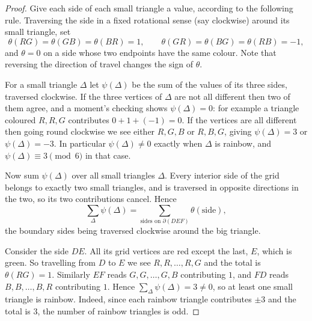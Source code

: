 \documentclass[a4paper]{scrartcl}
\begin{document}
\begin{proof}
	Give each side of each small triangle a value, according to the following rule. Traversing the side in a fixed rotational sense (say clockwise) around its small triangle, set
	$$\theta(RG) = \theta(GB) = \theta(BR) = 1, \qquad \theta(GR)=\theta(BG)=\theta(RB) = -1,$$
	and $\theta = 0$ on a side whose two endpoints have the same colour. Note that reversing the direction of travel changes the sign of $\theta$.

	For a small triangle $\Delta$ let $\psi(\Delta)$ be the sum of the values of its three sides, traversed clockwise. If the three vertices of $\Delta$ are not all different then two of them agree, and a moment's checking shows $\psi(\Delta) = 0$: for example a triangle coloured $R,R,G$ contributes $0 + 1 + (-1) = 0$. If the vertices are all different then going round clockwise we see either $R,G,B$ or $R,B,G$, giving $\psi(\Delta) = 3$ or $\psi(\Delta) = -3$. In particular $\psi(\Delta) \neq 0$ exactly when $\Delta$ is rainbow, and $\psi(\Delta) \equiv 3 \pmod 6$ in that case.

	Now sum $\psi(\Delta)$ over all small triangles $\Delta$. Every interior side of the grid belongs to exactly two small triangles, and is traversed in opposite directions in the two, so its two contributions cancel. Hence
	$$\sum_\Delta \psi(\Delta) = \sum_{\text{sides on }\partial(DEF)} \theta(\text{side}),$$
	the boundary sides being traversed clockwise around the big triangle.

	Consider the side $DE$. All its grid vertices are red except the last, $E$, which is green. So travelling from $D$ to $E$ we see $R,R,\ldots,R,G$ and the total is $\theta(RG) = 1$. Similarly $EF$ reads $G,G,\ldots,G,B$ contributing $1$, and $FD$ reads $B,B,\ldots,B,R$ contributing $1$. Hence $\sum_\Delta \psi(\Delta) = 3 \neq 0$, so at least one small triangle is rainbow. Indeed, since each rainbow triangle contributes $\pm3$ and the total is $3$, the number of rainbow triangles is odd.
\end{proof}
\end{document}
